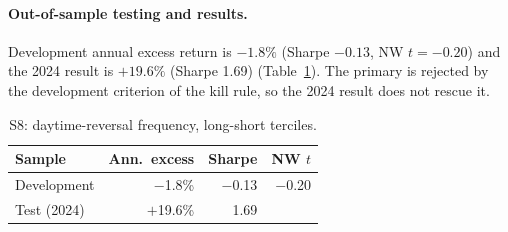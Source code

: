 \documentclass[../main.tex]{subfiles}
\begin{document}
\paragraph{Out-of-sample testing and results.}
Development annual excess return is $-1.8\%$ (Sharpe $-0.13$, NW $t = -0.20$) and the 2024 result is $+19.6\%$ (Sharpe 1.69) (Table~\ref{tab:s8}). The primary is rejected by the development criterion of the kill rule, so the 2024 result does not rescue it.

\begin{table}[tbp]
\centering\small
\caption{S8: daytime-reversal frequency, long-short terciles.}\label{tab:s8}
\begin{tabular}{@{}lrrr@{}}
\toprule
Sample & Ann.\ excess & Sharpe & NW $t$ \\
\midrule
Development & $-$1.8\% & $-$0.13 & $-$0.20 \\
Test (2024) & $+$19.6\% & 1.69 & \\
\bottomrule
\end{tabular}
\end{table}
\end{document}
